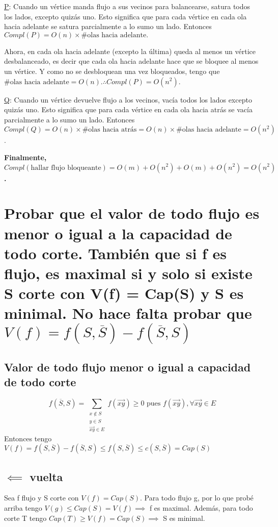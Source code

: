 \documentclass[11pt]{article}
\begin{document}
\uline{P}:
Cuando un vértice manda flujo a sus vecinos para balancearse, satura todos los lados, excepto quizás uno. Esto significa que para cada vértice en cada ola hacia adelante se satura parcialmente a lo sumo un lado. Entonces \(Compl(P) = O(n) \times \# \text{olas hacia adelante}.\)

Ahora, en cada ola hacia adelante (excepto la última) queda al menos un vértice desbalanceado, es decir que cada ola hacia adelante hace que se bloquee al menos un vértice. Y como no se desbloquean una vez bloqueados, tengo que \(\# \text{olas hacia adelante} = O(n). \therefore Compl(P) = O(n^2)\).

\uline{Q}:
Cuando un vértice devuelve flujo a los vecinos, vacía todos los lados excepto quizás uno. Esto significa que para cada vértice en cada ola hacia atrás se vacía parcialmente a lo sumo un lado. Entonces \(Compl(Q) = O(n) \times \# \text{olas hacia atrás} = O(n) \times \# \text{olas hacia adelante} = O(n^2)\).

\textbf{Finalmente, \(Compl(\text{hallar flujo bloqueante}) = O(m) + O(n^2) + O(m) + O(n^2) = O(n^2)\).}


\section{Probar que el valor de todo flujo es menor o igual a la capacidad de todo corte. También que si f es flujo, es maximal si y solo si existe S corte con V(f) = Cap(S) y S es minimal. No hace falta probar que \(V(f) = f(S, \overline{S}) - f(\overline{S}, S)\)}
\label{sec:org6da2adf}
\subsection{Valor de todo flujo menor o igual a capacidad de todo corte}
\label{sec:org1209484}
\[
f(\overline{S}, S) = \sum_{\substack{x \not\in S \\ y \in S \\ \overrightarrow{xy} \in E}} f(\overrightarrow{xy}) \ge 0 \text{ pues } f(\overrightarrow{xy}), \forall \overrightarrow{xy} \in E
\]
Entonces tengo \(V(f) = f(S, \overline{S}) - f(\overline{S}, S) \le f(S, \overline{S}) \le c(S, \overline{S}) = Cap(S)\)

\subsection{\(\impliedby\) vuelta}
\label{sec:org0739cf8}
Sea f flujo y S corte con \(V(f) = Cap(S)\). Para todo flujo g, por lo que probé arriba tengo \(V(g) \le Cap(S) = V(f) \implies\) f es maximal. Además, para todo corte T tengo \(Cap(T) \ge V(f) = Cap(S) \implies\) S es minimal.
\end{document}
